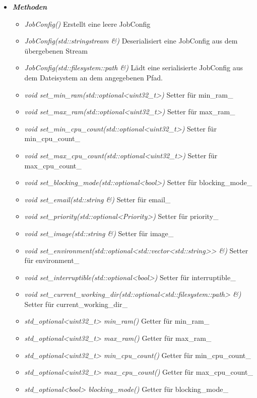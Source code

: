 \documentclass[a4paper,12pt]{article}
\begin{document}
\begin{itemize}[label={}]
	\item \textit{\textbf{Methoden}}
		\begin{itemize}[label={\textbullet}]
			\item \textit{JobConfig()} Erstellt eine leere JobConfig
			\item \textit{JobConfig(std::stringstream \&)} Deserialisiert eine JobConfig aus dem übergebenen Stream
			\item \textit{JobConfig(std::filesystem::path \&)} Lädt eine serialisierte JobConfig aus dem Dateisystem an dem angegebenen Pfad.
			\item \textit{void set\_min\_ram(std::optional<uint32\_t>)} Setter für min\_ram\_
			\item \textit{void set\_max\_ram(std::optional<uint32\_t>)} Setter für max\_ram\_
			\item \textit{void set\_min\_cpu\_count(std::optional<uint32\_t>)} Setter für min\_cpu\_count\_
			\item \textit{void set\_max\_cpu\_count(std::optional<uint32\_t>)} Setter für max\_cpu\_count\_
			\item \textit{void set\_blocking\_mode(std::optional<bool>)} Setter für blocking\_mode\_
			\item \textit{void set\_email(std::string \&)} Setter für email\_
			\item \textit{void set\_priority(std::optional<Priority>)} Setter für priority\_
			\item \textit{void set\_image(std::string \&)} Setter für image\_
			\item \textit{void set\_environment(std::optional<std::vector<std::string>> \&)} Setter für environment\_
			\item \textit{void set\_interruptible(std::optional<bool>)} Setter für interruptible\_
			\item \textit{void set\_current\_working\_dir(std::optional<std::filesystem::path> \&)} Setter für
			current\_working\_dir\_
			\item \textit{std\_optional<uint32\_t> min\_ram()} Getter für min\_ram\_
			\item \textit{std\_optional<uint32\_t> max\_ram()} Getter für max\_ram\_
			\item \textit{std\_optional<uint32\_t> min\_cpu\_count()} Getter für min\_cpu\_count\_
			\item \textit{std\_optional<uint32\_t> max\_cpu\_count()} Getter für max\_cpu\_count\_
			\item \textit{std\_optional<bool> blocking\_mode()} Getter für blocking\_mode\_

\end{itemize}
\end{itemize}
\end{document}
